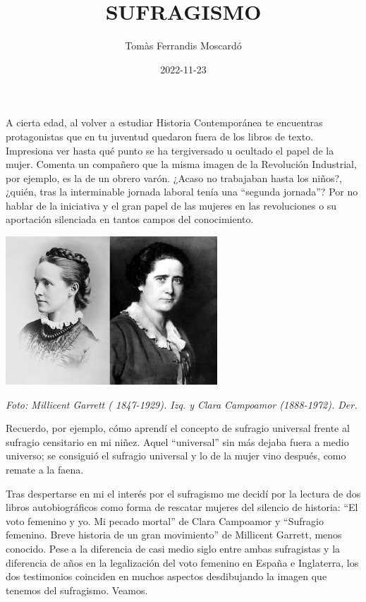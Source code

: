 \documentclass[
]{article}
\title{SUFRAGISMO}
\author{Tomàs Ferrandis Moscardó}
\date{2022-11-23}
\begin{document}
\maketitle

{
\setcounter{tocdepth}{2}
\tableofcontents
}
A cierta edad, al volver a estudiar Historia Contemporánea te encuentras
protagonistas que en tu juventud quedaron fuera de los libros de texto.
Impresiona ver hasta qué punto se ha tergiversado u ocultado el papel de
la mujer. Comenta un compañero que la misma imagen de la Revolución
Industrial, por ejemplo, es la de un obrero varón. ¿Acaso no trabajaban
hasta los niños?, ¿quién, tras la interminable jornada laboral tenía una
``segunda jornada''? Por no hablar de la iniciativa y el gran papel de
las mujeres en las revoluciones o su aportación silenciada en tantos
campos del conocimiento.

\includegraphics{png/Clara_Campoamor-y-Millicent_Garret.jpg}

\emph{Foto: Millicent Garrett ( 1847-1929). Izq. y Clara Campoamor
(1888-1972). Der.}

Recuerdo, por ejemplo, cómo aprendí el concepto de sufragio universal
frente al sufragio censitario en mi niñez. Aquel ``universal'' sin más
dejaba fuera a medio universo; se consiguió el sufragio universal y lo
de la mujer vino después, como remate a la faena.

Tras despertarse en mi el interés por el sufragismo me decidí por la
lectura de dos libros autobiográficos como forma de rescatar mujeres del
silencio de historia: ``El voto femenino y yo. Mi pecado mortal'' de
Clara Campoamor y ``Sufragio femenino. Breve historia de un gran
movimiento'' de Millicent Garrett, menos conocido. Pese a la diferencia
de casi medio siglo entre ambas sufragistas y la diferencia de años en
la legalización del voto femenino en España e Inglaterra, los dos
testimonios coinciden en muchos aspectos desdibujando la imagen que
tenemos del sufragismo. Veamos.
\end{document}

